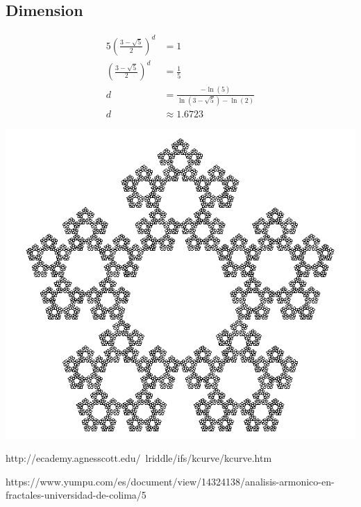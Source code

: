 \documentclass[a4paper, 12pt]{report}
\begin{document}
			\subsection{Dimension}
				\begin{align*}
					 5\left(\frac{3-\sqrt{5}}{2}\right)^d	&=1\\
					 \left(\frac{3-\sqrt{5}}{2}\right)^d	&=\frac{1}{5}\\
														d	&=\frac{-\ln(5)}{\ln(3-\sqrt{5})-\ln(2)}\\
														d	&\approx 1.6723
				\end{align*}
				\begin{center}
					\includegraphics[scale=0.5]{Images/pentakun.png}
				\end{center}
				
http://ecademy.agnesscott.edu/~lriddle/ifs/kcurve/kcurve.htm

https://www.yumpu.com/es/document/view/14324138/analisis-armonico-en-fractales-universidad-de-colima/5
\end{document}
